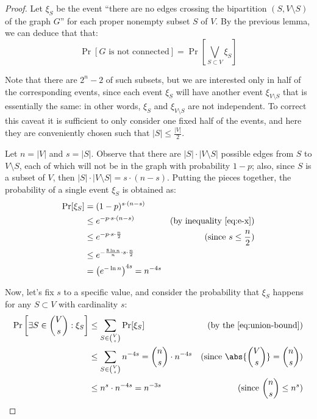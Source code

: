 \begin{proof}
    Let $\xi_S$ be the event ``there are no edges crossing the bipartition $(S, V \setminus S)$ of the graph $G$'' for each proper nonempty subset $S$ of $V$. By the previous lemma, we can deduce that that:
    \[
        \Pr[G \text{ is not connected}] = \Pr\left[\bigvee_{S \subset V} \xi_S\right]
    \]
    
    Note that there are $2^n - 2$ of such subsets, but we are interested only in half of the corresponding events, since each event $\xi_S$ will have another event $\xi_{V \setminus S}$ that is essentially the same: in other words,  $\xi_S$ and $\xi_{V \setminus S}$ are not independent. To correct this caveat it is sufficient to only consider one fixed half of the events, and here they are conveniently chosen such that $|S| \leq \frac{|V|}{2}$.
    
    Let $n = |V|$ and $s = |S|$. Observe that there are $|S| \cdot |V \setminus S|$ possible edges from $S$ to $V \setminus S$, each of which will not be in the graph with probability $1 - p$; also, since $S$ is a subset of $V$, then $|S| \cdot |V \setminus S| = s \cdot (n - s)$. Putting the pieces together, the probability of a single event $\xi_S$ is obtained as:
    \begin{align*}
        \Pr[\xi_S] &= (1 - p)^{s \cdot (n - s)}                   &                                     \\
        &\leq e^{-p \cdot s \cdot (n - s)}                        & \text{(by inequality \ref{eq:e-x})} \\
        &\leq e^{-p \cdot s \cdot \frac{n}{2}}                    & \text{(since $s \leq \frac{n}{2}$)} \\
        &\leq e^{-\frac{8 \ln n}{n} \cdot s \cdot \frac{n}{2}}    &                                     \\
        &= \left(e^{-\ln n} \right)^{4 s} = n^{-4 s}  & 
    \end{align*}
    
    Now, let's fix $s$ to a specific value, and consider the probability that $\xi_S$ happens for any $S \subset V$ with cardinality $s$:
    \begin{align*}
        \Pr\left[\exists S \in \binom{V}{s} : \xi_S\right] &\leq \sum_{S \in \binom{V}{s}} \Pr[\xi_S] & \text{(by the \ref{eq:union-bound})}               \\
        &\leq \sum_{S \in \binom{V}{s}} n^{-4s} = \binom{n}{s} \cdot n^{-4s}               & \text{(since $\displaystyle \abs{\binom{V}{s}} = \binom{n}{s}$)} \\
        &\leq n^s \cdot n^{-4s} = n^{-3s}                                                  & \text{(since $\displaystyle \binom{n}{s} \leq n^s)$} \\
    \end{align*}
    

\end{proof}
